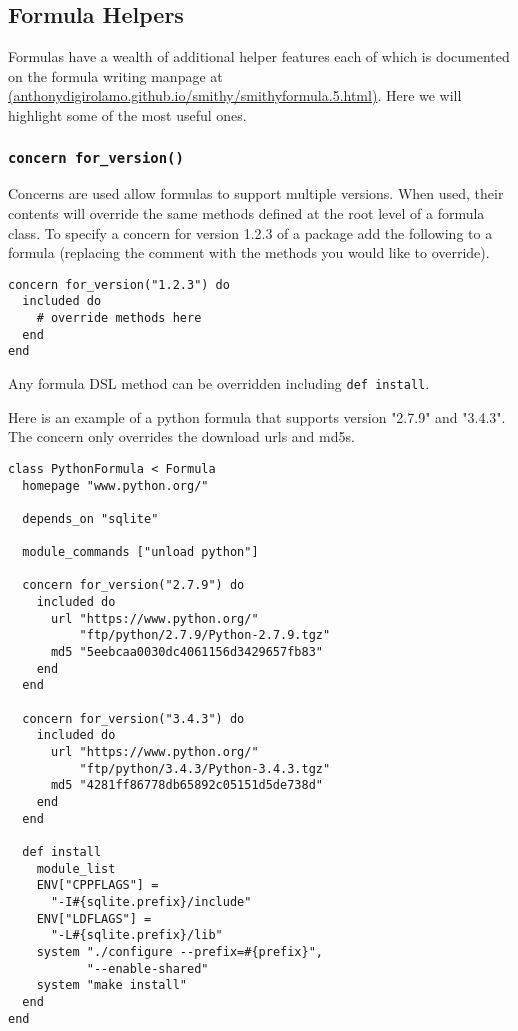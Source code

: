 \documentclass{acm_proc_article-sp}
\begin{document}
\subsection{Formula Helpers}

Formulas have a wealth of additional helper features each of which is documented
on the formula writing manpage at \\
\href{http://anthonydigirolamo.github.io/smithy/smithyformula.5.html}{(anthonydigirolamo.github.io/smithy/smithyformula.5.html)}.
Here we will highlight some of the most useful ones.

\subsubsection{\texttt{concern for\_version()}}

Concerns are used allow formulas to support multiple versions. When used, their
contents will override the same methods defined at the root level of a formula
class. To specify a concern for version 1.2.3 of a package add the following to
a formula (replacing the comment with the methods you would like to override).

\begin{quoting}
\begin{verbatim}
concern for_version("1.2.3") do
  included do
    # override methods here
  end
end
\end{verbatim}
\end{quoting}

Any formula DSL method can be overridden including \texttt{def install}.

Here is an example of a python formula that supports version "2.7.9" and
"3.4.3". The concern only overrides the download urls and md5s.

\begin{quoting}
\begin{verbatim}
class PythonFormula < Formula
  homepage "www.python.org/"

  depends_on "sqlite"

  module_commands ["unload python"]

  concern for_version("2.7.9") do
    included do
      url "https://www.python.org/"
          "ftp/python/2.7.9/Python-2.7.9.tgz"
      md5 "5eebcaa0030dc4061156d3429657fb83"
    end
  end

  concern for_version("3.4.3") do
    included do
      url "https://www.python.org/"
          "ftp/python/3.4.3/Python-3.4.3.tgz"
      md5 "4281ff86778db65892c05151d5de738d"
    end
  end

  def install
    module_list
    ENV["CPPFLAGS"] =
      "-I#{sqlite.prefix}/include"
    ENV["LDFLAGS"] =
      "-L#{sqlite.prefix}/lib"
    system "./configure --prefix=#{prefix}",
           "--enable-shared"
    system "make install"
  end
end
\end{verbatim}
\end{quoting}
\end{document}
